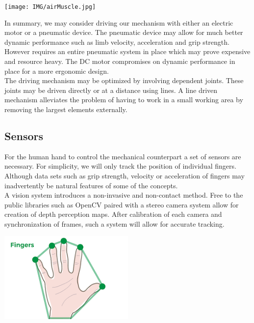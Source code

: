 \documentclass{article}
\begin{document}
\begin{center}
\texttt{[image: IMG/airMuscle.jpg]}
\end{center}

In summary, we may consider driving our mechanism with either an electric motor or a pneumatic device. The pneumatic device may allow for much better dynamic performance such as limb velocity, acceleration and grip strength. However requires an entire pneumatic system in place which may prove expensive and resource heavy. The DC motor compromises on dynamic performance in place for a more ergonomic design.\\[12pt]
\indent The driving mechanism may be optimized by involving dependent joints. These joints may be driven directly or at a distance using lines. A line driven mechanism alleviates the problem of having to work in a small working area by removing the largest elements externally. 

\subsection{Sensors}
For the human hand to control the mechanical counterpart a set of sensors are necessary. For simplicity, we will only track the position of individual fingers. Although data sets such as grip strength, velocity or acceleration of fingers may inadvertently be natural features of some of the concepts.\\[12pt]
\indent A vision system introduces a non-invasive and non-contact method. Free to the public libraries such as OpenCV paired with a stereo camera system allow for creation of depth perception maps. After calibration of each camera and synchronization of frames, such a system will allow for accurate tracking.

\begin{center}
\includegraphics[width=0.5\textwidth]{IMG/HandSens.png}
\end{center}
\end{document}
